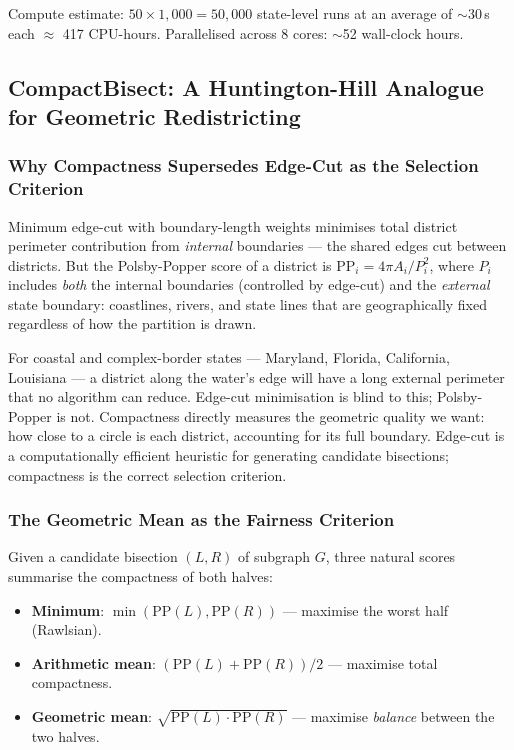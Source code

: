 Compute estimate: $50 \times 1{,}000 = 50{,}000$ state-level runs at an
average of $\sim$30\,s each $\approx$ 417 CPU-hours. Parallelised across 8
cores: $\sim$52 wall-clock hours.

\subsection{CompactBisect: A Huntington-Hill Analogue for Geometric Redistricting}
\label{sec:methodology:compactbisect}

\subsubsection{Why Compactness Supersedes Edge-Cut as the Selection Criterion}

Minimum edge-cut with boundary-length weights minimises total district
perimeter contribution from \emph{internal} boundaries --- the shared edges
cut between districts. But the Polsby-Popper score of a district is
$\mathrm{PP}_i = 4\pi A_i / P_i^2$, where $P_i$ includes \emph{both} the
internal boundaries (controlled by edge-cut) and the \emph{external} state
boundary: coastlines, rivers, and state lines that are geographically fixed
regardless of how the partition is drawn.

For coastal and complex-border states --- Maryland, Florida, California,
Louisiana --- a district along the water's edge will have a long external
perimeter that no algorithm can reduce. Edge-cut minimisation is blind to
this; Polsby-Popper is not. Compactness directly measures the geometric
quality we want: how close to a circle is each district, accounting for
its full boundary. Edge-cut is a computationally efficient heuristic for
generating candidate bisections; compactness is the correct selection criterion.

\subsubsection{The Geometric Mean as the Fairness Criterion}

Given a candidate bisection $(L, R)$ of subgraph $G$, three natural scores
summarise the compactness of both halves:

\begin{itemize}
  \item \textbf{Minimum}: $\min(\mathrm{PP}(L), \mathrm{PP}(R))$ ---
        maximise the worst half (Rawlsian).
  \item \textbf{Arithmetic mean}: $(\mathrm{PP}(L) + \mathrm{PP}(R))/2$ ---
        maximise total compactness.
  \item \textbf{Geometric mean}: $\sqrt{\mathrm{PP}(L) \cdot \mathrm{PP}(R)}$
        --- maximise \emph{balance} between the two halves.
\end{itemize}

